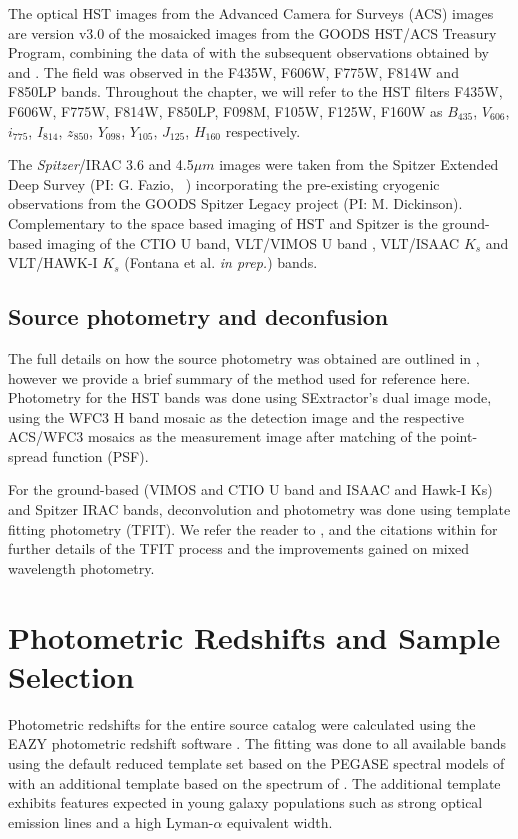 The optical HST images from the Advanced Camera for Surveys (ACS) images are version v3.0 of the mosaicked images from the GOODS HST/ACS Treasury Program, combining the data of \citet{2004ApJ...600L..93G} with the subsequent observations obtained by \citet{2006AJ....132.1729B} and \citep{Koekemoer:2011br}. The field was observed in the F435W, F606W, F775W, F814W and F850LP bands. Throughout the chapter, we will refer to the HST filters F435W, F606W, F775W, F814W, F850LP, F098M, F105W, F125W, F160W as $B_{435}$, $V_{606}$, $i_{775}$, $I_{814}$, $z_{850}$, $Y_{098}$, $Y_{105}$, $J_{125}$, $H_{160}$ respectively. 

The \emph{Spitzer}/IRAC \citep{Fazio:2004eb} 3.6 and 4.5$\mu m$ images were taken from the Spitzer Extended Deep Survey (PI: G. Fazio, \citeauthor{Ashby:2013cc}~\citeyear{Ashby:2013cc}) incorporating the pre-existing cryogenic observations from the GOODS Spitzer Legacy project (PI: M. Dickinson). Complementary to the space based imaging of HST and Spitzer is the ground-based imaging of the CTIO U band, VLT/VIMOS U band \citep{Nonino:2009hf}, VLT/ISAAC $K_{s}$ \citep{Retzlaff:2010co} and VLT/HAWK-I $K_{s}$ (Fontana et al. \emph{in prep.}) bands.

\subsection{Source photometry and deconfusion}
The full details on how the source photometry was obtained are outlined in \citet{Guo:2013ig}, however we provide a brief summary of the method used for reference here. Photometry for the HST bands was done using SExtractor's dual image mode, using the WFC3 H band mosaic as the detection image and the respective ACS/WFC3 mosaics as the measurement image after matching of the point-spread function (PSF). 

For the ground-based (VIMOS and CTIO U band and ISAAC and Hawk-I Ks) and Spitzer IRAC bands, deconvolution and photometry was done using template fitting photometry (TFIT). We refer the reader to \citet{Laidler:2007iy}, \citet{2012ApJ...752...66L} and the citations within for further details of the TFIT process and the improvements gained on mixed wavelength photometry.

\section{Photometric Redshifts and Sample Selection}\label{sec:redshift}
Photometric redshifts for the entire source catalog were calculated using the EAZY photometric redshift software \citep{Brammer:2008gn}. The fitting was done to all available bands using the default reduced template set based on the PEGASE spectral models of \citet{1997A&A...326..950F} with an additional template based on the spectrum of \citet{2010ApJ...719.1168E}. The additional template exhibits features expected in young galaxy populations such as strong optical emission lines and a high Lyman-$\alpha$ equivalent width.

